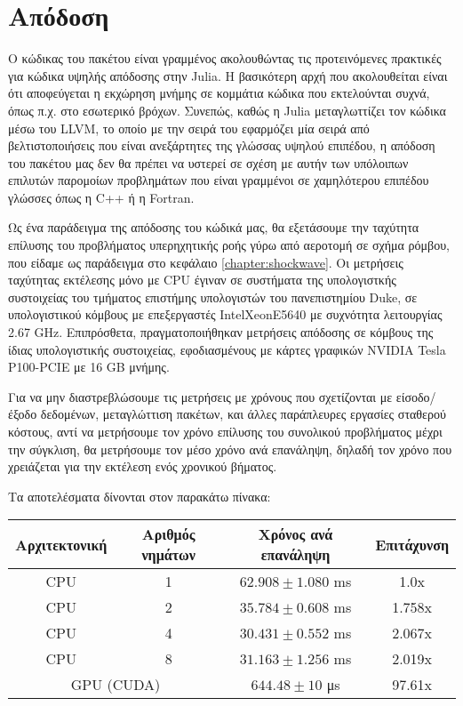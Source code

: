 \section{Απόδοση}

Ο κώδικας του πακέτου είναι γραμμένος ακολουθώντας τις προτεινόμενες πρακτικές για κώδικα υψηλής απόδοσης στην Julia.
Η βασικότερη αρχή που ακολουθείται είναι ότι αποφεύγεται η εκχώρηση μνήμης σε κομμάτια κώδικα που εκτελούνται συχνά, όπως π.χ. στο εσωτερικό βρόχων.
Συνεπώς, καθώς η Julia μεταγλωττίζει τον κώδικα μέσω του LLVM, το οποίο με την σειρά του εφαρμόζει μία σειρά από βελτιστοποιήσεις που είναι ανεξάρτητες της γλώσσας υψηλού επιπέδου, η απόδοση του πακέτου μας δεν θα πρέπει να υστερεί σε σχέση με αυτήν των υπόλοιπων επιλυτών παρομοίων προβλημάτων που είναι γραμμένοι σε χαμηλότερου επιπέδου γλώσσες όπως η C++ ή η Fortran.

Ως ένα παράδειγμα της απόδοσης του κώδικά μας, θα εξετάσουμε την ταχύτητα επίλυσης του προβλήματος υπερηχητικής ροής γύρω από αεροτομή σε σχήμα ρόμβου, που είδαμε ως παράδειγμα στο κεφάλαιο \ref{chapter:shockwave}.
Οι μετρήσεις ταχύτητας εκτέλεσης μόνο με CPU έγιναν σε συστήματα της υπολογιστκής συστοιχείας του τμήματος επιστήμης υπολογιστών του πανεπιστημίου Duke, σε υπολογιστικού κόμβους με επεξεργαστές Intel\textregistered  Xeon\textregistered  E5640 με συχνότητα λειτουργίας 2.67 GHz.
Επιπρόσθετα, πραγματοποιήθηκαν μετρήσεις απόδοσης σε κόμβους της ίδιας υπολογιστικής συστοιχείας, εφοδιασμένους με κάρτες γραφικών NVIDIA Tesla P100-PCIE με 16 GB μνήμης.

Για να μην διαστρεβλώσουμε τις μετρήσεις με χρόνους που σχετίζονται με είσοδο/έξοδο δεδομένων, μεταγλώττιση πακέτων, και άλλες παράπλευρες εργασίες σταθερού κόστους, αντί να μετρήσουμε τον χρόνο επίλυσης του συνολικού προβλήματος μέχρι την σύγκλιση, θα μετρήσουμε τον μέσο χρόνο ανά επανάληψη, δηλαδή τον χρόνο που χρειάζεται για την εκτέλεση ενός χρονικού βήματος.

Τα αποτελέσματα δίνονται στον παρακάτω πίνακα:

\begin{center}
    \begin{tabular}{|c|c|c|c| }
        \hline
        Αρχιτεκτονική & Αριθμός νημάτων & Χρόνος ανά επανάληψη & Επιτάχυνση \\
        \hline
        CPU & 1 & $62.908 \pm 1.080$ ms & 1.0x \\
        CPU & 2 & $35.784 \pm 0.608$ ms & 1.758x \\
        CPU & 4 & $30.431 \pm 0.552$ ms & 2.067x \\
        CPU & 8 & $31.163 \pm 1.256$ ms & 2.019x \\
        \hline
        \multicolumn{2}{|c|}{GPU (CUDA)} & $644.48 \pm 10 $ μs & 97.61x \\
        \hline
    \end{tabular}
\end{center}

